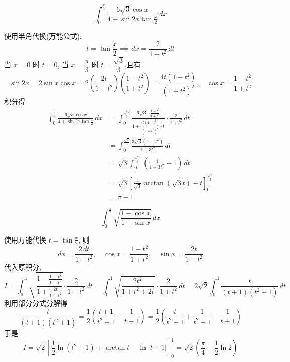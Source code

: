 \begin{questions}
    \question
    \[
    \int_{0}^{\frac{\pi}{3}} \frac{6\sqrt{3}\cos x}{4 + \sin 2x \tan \frac{x}{2}} \,dx
    \]
    \begin{solution}
        使用半角代换(万能公式):
        \[
        t = \tan \frac{x}{2} \implies dx = \frac{2}{1+t^2} \,dt
        \]
        当 $x=0$ 时 $t=0$, 当 $x=\dfrac{\pi}{3}$ 时 $t=\dfrac{\sqrt{3}}{3}$,且有
        \[
        \sin 2x = 2\sin x \cos x = 2 \left( \frac{2t}{1+t^2} \right) \left( \frac{1-t^2}{1+t^2} \right) = \frac{4t(1-t^2)}{(1+t^2)^2}, \quad \cos x = \frac{1-t^2}{1+t^2}
        \]
        积分得
        \begin{align*}
        \int_{0}^{\frac{\pi}{3}} \frac{6\sqrt{3}\cos x}{4 + \sin 2x \tan \frac{x}{2}} \,dx &= \int_{0}^{\frac{\sqrt{3}}{3}} \frac{6\sqrt{3} \cdot \frac{1-t^2}{1+t^2}}{4 + \frac{4t(1-t^2)}{(1+t^2)^2} \cdot t} \cdot \frac{2}{1+t^2} \,dt \\
        &= \int_{0}^{\frac{\sqrt{3}}{3}} \frac{3\sqrt{3}(1-t^2)}{1+3t^2} \,dt \\
        &= \sqrt{3} \int_{0}^{\frac{\sqrt{3}}{3}} \left( \frac{4}{1+3t^2} - 1 \right) \,dt \\
        &= \sqrt{3} \left[ \frac{4}{\sqrt{3}} \arctan(\sqrt{3}t) - t \right]_{0}^{\frac{\sqrt{3}}{3}} \\
        &= \pi-1
        \end{align*}
    \end{solution}

    \question 
    \[
    \int_{0}^{\frac{\pi}{2}} \sqrt{\frac{1-\cos x}{1+\sin x}} \,dx
    \]
    \begin{solution}
        使用万能代换 $t = \tan \frac{x}{2}$, 则
        \[
        dx = \frac{2 \,dt}{1+t^2}, \quad \cos x = \frac{1-t^2}{1+t^2}, \quad \sin x = \frac{2t}{1+t^2}
        \]
        代入原积分,
        \[
        I = \int_{0}^{1} \sqrt{\frac{1-\frac{1-t^2}{1+t^2}}{1+\frac{2t}{1+t^2}}} \cdot \frac{2}{1+t^2} \,dt = \int_{0}^{1} \sqrt{\frac{2t^2}{1+t^2+2t}} \cdot \frac{2}{1+t^2} \,dt
        = 2\sqrt{2} \int_{0}^{1} \frac{t}{(t+1)(t^2+1)} \,dt
        \]
        利用部分分式分解得
        \[
        \frac{t}{(t+1)(t^2+1)} = \frac{1}{2} \left( \frac{t+1}{t^2+1} - \frac{1}{t+1} \right) = \frac{1}{2} \left( \frac{t}{t^2+1} + \frac{1}{t^2+1} - \frac{1}{t+1} \right)
        \]
        于是
        \[
        I = \sqrt{2} \left[ \frac{1}{2} \ln(t^2+1) + \arctan t - \ln|t+1| \right]_{0}^{1}
        = \sqrt{2} \left( \frac{\pi}{4} - \frac{1}{2} \ln 2 \right)
        \]
    \end{solution}


\end{questions}
